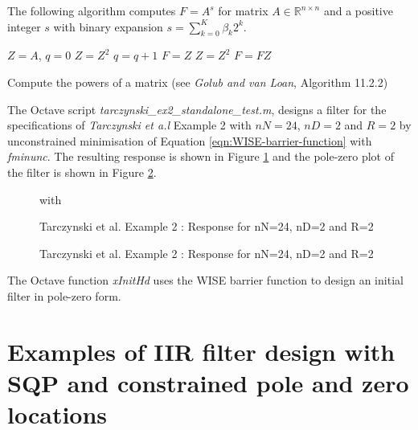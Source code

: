 \documentclass[a4paper,twoside,10pt,english]{report}
\begin{document}
\begin{algorithm}[!hb]
The following algorithm computes $F=A^{s}$ for matrix 
$A \in \mathbb{R}^{n\times n}$ and a positive integer $s$ with binary 
expansion $s=\sum_{k=0}^{K}{\beta_{k}2^{k}}$.
\begin{algorithmic}
\State $Z=A$, $q=0$
  \State $Z=Z^{2}$
  \State $q=q+1$
\EndWhile
\State $F=Z$
  \State $Z=Z^{2}$
    \State $F=FZ$
  \EndIf
\EndFor
\end{algorithmic}
\caption{Compute the powers of a matrix (see \emph{Golub and van Loan}, Algorithm 11.2.2)}
\label{alg:Compute-powers-of-matrix}
\end{algorithm}

The Octave script \emph{tarczynski\_ex2\_standalone\_test.m}, designs a filter 
for the specifications of \emph{Tarczynski et a.l} Example 2
\cite{TarczynskiCainHermanowiczRojewski_WISEMethodDesignIIRFilters} with 
$nN=24$, $nD=2$ and $R=2$ by unconstrained minimisation of Equation 
\ref{eqn:WISE-barrier-function} with \emph{fminunc}. The resulting response
is shown in Figure \ref{fig:tarczynski-ex2-standalone-response} and the pole-zero
plot of the filter is shown in Figure \ref{fig:tarczynski-ex2-standalone-pz}.
\begin{figure}[!htbp]
\begin{center}
\scalebox{0.7}{}
\caption{Tarczynski et al. Example 2 : Response for nN=24, nD=2 and R=2}
\label{fig:tarczynski-ex2-standalone-response} with 
\end{center}
\end{figure}
\begin{figure}[!htbp]
\begin{center}
\scalebox{0.7}{}
\caption{Tarczynski et al. Example 2 : Response for nN=24, nD=2 and R=2}
\label{fig:tarczynski-ex2-standalone-pz}
\end{center}
\end{figure}

The Octave function \emph{xInitHd} uses the WISE barrier function to design an 
initial filter in pole-zero form.
\cleardoublepage{}
\section{\label{sec:Examples-of-IIR-filter-design-SQP}Examples of IIR filter design with SQP and constrained pole and zero locations}
\end{document}
